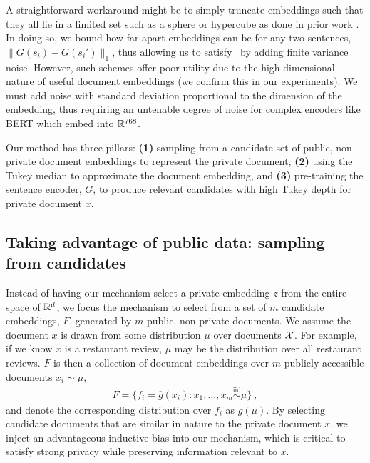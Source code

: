 A straightforward workaround might be to simply truncate embeddings such that they all lie in a limited set such as a sphere or hypercube as done in prior work \cite{clifton, abadi}. In doing so, we bound how far apart embeddings can be for any two sentences, $\|G(s_i) - G(s_i')\|_1$, thus allowing us to satisfy \SDP~by adding finite variance noise. However, such schemes offer poor utility due to the high dimensional nature of useful document embeddings (we confirm this in our experiments). We must add noise with standard deviation proportional to the dimension of the embedding, thus requiring an untenable degree of noise for complex encoders like BERT which embed into ${\mathbb R}^{768}$. 

Our method has three pillars: \textbf{(1)} sampling from a candidate set of public, non-private document embeddings to represent the private document, \textbf{(2)} using the Tukey median to approximate the document embedding, and \textbf{(3)} pre-training the sentence encoder, $G$, to produce relevant candidates with high Tukey depth for private document $x$. 

\subsection{Taking advantage of public data: sampling from candidates}
Instead of having our mechanism select a private embedding $z$ from the entire space of ${\mathbb R}^d$, we focus the mechanism to select from a set of $m$ candidate  embeddings, $F$, generated by $m$ public, non-private documents. We assume the document $x$ is drawn from some distribution $\mu$ over documents $\mathcal{X}$. For example, if we know $x$ is a restaurant review, $\mu$ may be the distribution over all restaurant reviews. $F$ is then a collection of document embeddings over $m$ publicly accessible documents $x_i \sim \mu$, 
\begin{align*}
	F = \{f_i = \overline{g}(x_i) : x_1, \dots, x_m \overset{\text{iid}}{\sim} \mu\} \ , 
\end{align*}
and denote the corresponding distribution over $f_i$ as $\overline{g}(\mu)$. By selecting candidate documents that are similar in nature to the private document $x$, we inject an advantageous inductive bias into our mechanism, which is critical to satisfy strong privacy while preserving information relevant to $x$. 



